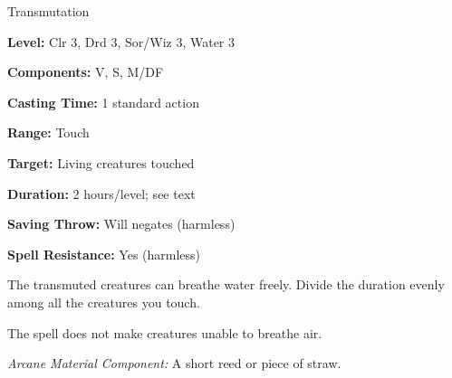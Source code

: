 
Transmutation

\textbf{Level:} Clr 3, Drd 3, Sor/Wiz 3, Water 3

\textbf{Components:} V, S, M/DF

\textbf{Casting Time:} 1 standard action

\textbf{Range:} Touch

\textbf{Target:} Living creatures touched

\textbf{Duration:} 2 hours/level; see text

\textbf{Saving Throw:} Will negates (harmless)

\textbf{Spell Resistance:} Yes (harmless)

The transmuted creatures can breathe water freely. Divide the duration evenly among 
all the creatures you touch.

The spell does not make creatures unable to breathe air.

\textit{Arcane Material Component:} A short reed or piece of straw.


